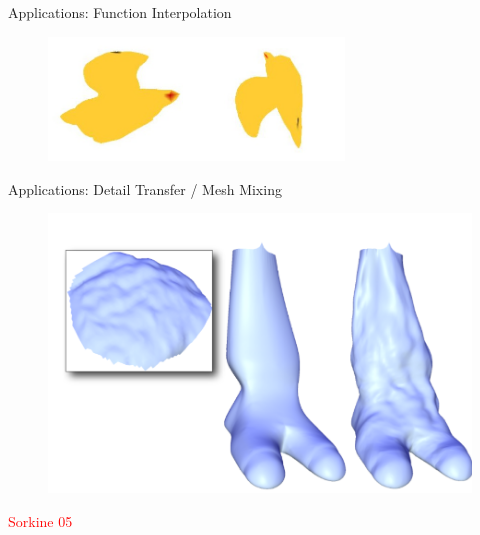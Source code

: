 \documentclass{beamer}
\begin{document}
\begin{frame}{Applications: Function Interpolation}

\begin{figure}[t]
    \includegraphics[width=0.7\textwidth]{FunctionSpecification.png}
\end{figure}


\end{frame}

\begin{frame}{Applications: Detail Transfer / Mesh Mixing}

\begin{figure}[t]
    \includegraphics[width=\textwidth]{Sorkine05_ShapeBlending2.png}
\end{figure}

\textcolor{red}{Sorkine 05}

\end{frame}
\end{document}
